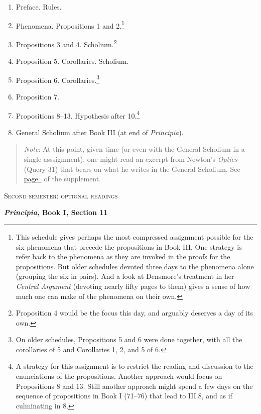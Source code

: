 \documentclass[10pt]{article}
\begin{document}
\begin{enumerate}[resume*] \item Preface. Rules.  \item
		Phenomena. Propositions 1 and
		2.\footnote{This schedule gives perhaps the
			most compressed assignment possible
			for the six phenomena that precede
			the propositions in Book III. One
			strategy is refer back to the
			phenomena as they are invoked in the
			proofs for the propositions. But
			older schedules devoted three days
			to the phenomena alone (grouping the
			six in pairs). And a look at
			Densmore's treatment in her
			\emph{Central Argument} (devoting
			nearly fifty pages to them) gives a
			sense of how much one can make of
			the phenomena on their own.}
	\item Propositions 3 and 4. Scholium.\footnote{Proposition 4 would be the focus this day, and arguably deserves a day of its own.}
	\item Proposition 5. Corollaries. Scholium.
	\item Proposition 6. Corollaries.\footnote{On older
			schedules, Propositions 5 and 6 were done
			together, with all the corollaries
			of 5 and Corollaries 1, 2, and 5 of
			6.} 
	\item Proposition 7. 
	\item Propositions 8--13. Hypothesis after
		10.\footnote{A strategy for this assignment
			is to restrict the reading and
			discussion to the enunciations of the
			propositions. Another approach would
		focus on Propositions 8 and 13. Still
		another approach might spend a few days on
		the sequence of propositions in Book I
		(71--76) that lead to III.8, and as if culminating in 8.}
	\item General Scholium after Book III (at end of
		\emph{Principia}).
	\end{enumerate}
	\begin{quote}
		{\small \emph{Note}: At this point, given
			time (or even with the
			General Scholium in a single 
			asssignment), one might read an excerpt from
		Newton's \emph{Optics} (Query 31) that bears
	on what he writes in the General Scholium. See
	\hyperref[supple.79]{page~\pageref{supple.79}} of the
		supplement.
		
		}
	\end{quote}	
	\begin{center} \textsc{\small{Second
				semester: optional
				readings}} \end{center}
	\textbf{\emph{Principia}, Book I, Section 11}
	\label{Newton} 
\end{document}
